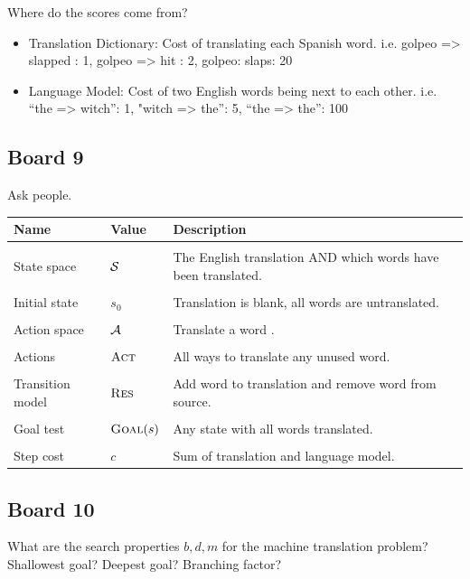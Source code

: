 \documentclass[10pt]{article}
\begin{document}
Where do the scores come from?
\begin{itemize}
\item Translation Dictionary: Cost of translating each Spanish word. i.e. golpeo => slapped : 1, golpeo => hit : 2, golpeo: slaps: 20

\item Language Model: Cost of two English words being next to each other. i.e. ``the => witch'': 1, "witch => the'': 5, ``the => the'': 100
\end{itemize}


\subsection{Board 9}

Ask people.

\air 
\begin{center}
\begin{tabularx}{\linewidth}{llX}
  \toprule
  Name & Value & Description \\
  \midrule
\\

 State space & $\mathcal{S}$ & The English translation AND which words have been translated. \\\\
 Initial state &  $s_0$ & Translation is blank, all words are untranslated.  \\\\
 Action space & $\mathcal{A}$& Translate a word . \\\\
 Actions&  $\mathrm{\textsc{Act}}$ & All ways to translate any unused word. \\\\
 Transition model&  $\mathrm{\textsc{Res}} $ &  Add word to translation and remove word from source.    \\\\
 Goal test& $\mathrm{\textsc{Goal}}(s)$ & Any state with all words translated. \\\\
 Step cost & $c$ &  Sum of translation and language model. \\
 \bottomrule
\end{tabularx}
\end{center}

\subsection{Board 10}

\begin{exercise}
  What are the search properties $b, d, m$ for the machine translation
  problem? Shallowest goal? Deepest goal? Branching factor?
\end{exercise}
\end{document}
